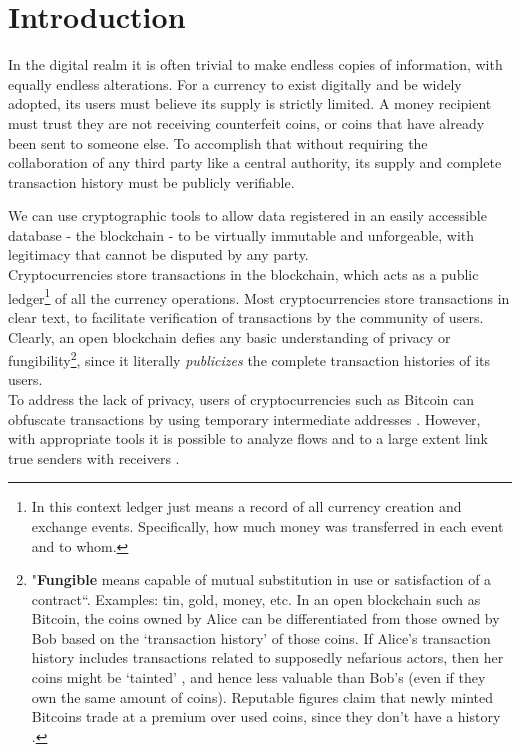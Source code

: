 \chapter{Introduction}
\label{chapter:introduction}

In the digital realm it is often trivial to make endless copies of information, with equally endless alterations. For a currency to exist digitally and be widely adopted, its users must believe its supply is strictly limited. A money recipient must trust they are not receiving counterfeit coins, or coins that have already been sent to someone else. To accomplish that without requiring the collaboration of any third party like a central authority, its supply and complete transaction history must be publicly verifiable.

We can use cryptographic tools to allow data registered in an easily accessible database - the blockchain - to be virtually immutable and unforgeable, with legitimacy that cannot be disputed by any party.
\\ \newline
Cryptocurrencies store transactions in the blockchain, which acts as a public ledger\footnote{In this context ledger just means a record of all currency creation and exchange events. Specifically, how much money was transferred in each event and to whom.} of all the currency operations. Most cryptocurrencies store transactions in clear text, to facilitate verification of transactions by the community of users.
\\ \newline
Clearly, an open blockchain defies any basic understanding of privacy or fungibility\footnote{"\textbf{Fungible} means capable of mutual substitution in use or satisfaction of a contract``\cite{mises-org-fungible}. Examples: tin, gold, money, etc. In an open blockchain such as Bitcoin, the coins owned by Alice can be differentiated from those owned by Bob based on the `transaction history' of those coins. If Alice's transaction history includes transactions related to supposedly nefarious actors, then her coins might be `tainted' \cite{bitcoin-big-bang-taint}, and hence less valuable than Bob's (even if they own the same amount of coins). Reputable figures claim that newly minted Bitcoins trade at a premium over used coins, since they don't have a history \cite{new-bitcoin-premium}.}, since it literally {\em publicizes} the complete transaction histories of its users.
\\ \newline
To address the lack of privacy, users of cryptocurrencies such as Bitcoin can obfuscate transactions by using temporary intermediate addresses \cite{DBLP:journals/corr/NarayananM17}. However, with appropriate tools it is possible to analyze flows and to a large extent link true senders with receivers \cite{DBLP:journals/corr/ShenTuY15b, DK-police-tracing-btc, Andrew-Cox-Sandia, chainalysis-2020-report}.

